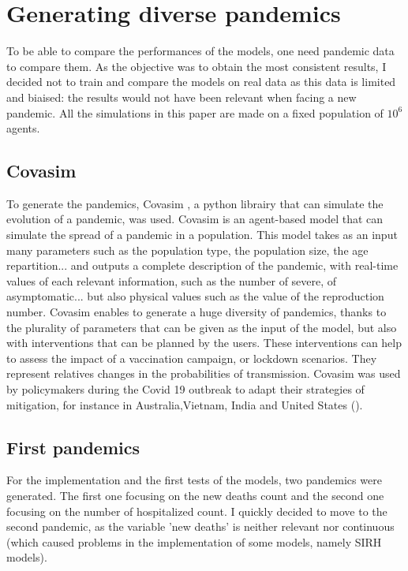 \section{Generating diverse pandemics}



To be able to compare the performances of the models, one need pandemic data to compare them. 
As the objective was to obtain the most consistent results, I decided not to train and compare the models on real data as this data is limited and biaised: the results would not have been relevant when facing a new pandemic. 
All the simulations in this paper are made on a fixed population of $10^6$ agents. 

\subsection{Covasim}

To generate the pandemics,  Covasim \cite{kerr2021covasim}, a python librairy that can simulate the evolution of a pandemic, was used. 
Covasim is an agent-based model that can simulate the spread of a pandemic in a population. 
This model takes as an input many parameters such as the population type, the population size, the age repartition... and outputs a complete description of the pandemic, with real-time values of each relevant information, such as the number of severe, of asymptomatic... but also physical values such as the value of the reproduction number. 
Covasim enables to generate a huge diversity of pandemics, thanks to the plurality of parameters that can be given as the input of the model, but also with interventions that can be planned by the users. 
These interventions can help to assess the impact of a vaccination campaign, or lockdown scenarios. 
They represent relatives changes in the probabilities of transmission. 
Covasim was used by policymakers during the Covid 19 outbreak to adapt their strategies of mitigation, for instance in Australia,Vietnam, India and United States (\cite{kerr2021covasim}). 

\subsection{First pandemics}

For the implementation and the first tests of the models, two pandemics were generated. 
The first one focusing on the new deaths count and the second one focusing on the number of hospitalized count. 
I quickly decided to move to the second pandemic, as the variable 'new deaths' is neither relevant nor continuous (which caused problems in the implementation of some models, namely SIRH models).


